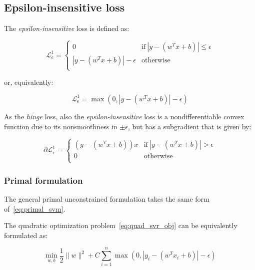 \pagebreak

\subsection{Epsilon-insensitive loss}

The \emph{epsilon-insensitive} loss is defined as:

\begin{equation} \label{eq:eps_loss1}
	\mathcal{L}_\epsilon^1 = 
	\begin{cases}
		0 & \text{if} \ |y - (w^T x + b)| \leq \epsilon \\
		|y - (w^T x + b)| - \epsilon & \text{otherwise} \\
	\end{cases}
\end{equation}

or, equivalently:

\begin{equation} \label{eq:eps_loss2}
	\mathcal{L}_\epsilon^1 = \max(0, |y - (w^T x + b)| - \epsilon)
\end{equation}

As the \emph{hinge} loss, also the \emph{epsilon-insensitive} loss is a nondifferentiable convex function due to its nonsmoothness in $\pm\epsilon$, but has a subgradient that is given by:

\begin{equation} \label{eq:eps_loss_der}
	\partial \mathcal{L}_\epsilon^1=
		\begin{cases}
            (y - (w^T x + b)) x & \text{if} \ |y - (w^T x + b)| > \epsilon \\
            0 & \text{otherwise} \\ 
        \end{cases}
\end{equation}

\subsubsection{Primal formulation}

The general primal unconstrained formulation takes the same form of~\eqref{eq:primal_svm}.

The quadratic optimization problem~\eqref{eq:quad_svr_obj} can be equivalently formulated as:

\begin{equation} \label{eq:primal_svr_eps}
	\min_{w,b} \frac{1}{2} \| w \|^2 + C \sum_{i=1}^n \max(0, |y_i - (w^T x_i + b)| - \epsilon)
\end{equation}

